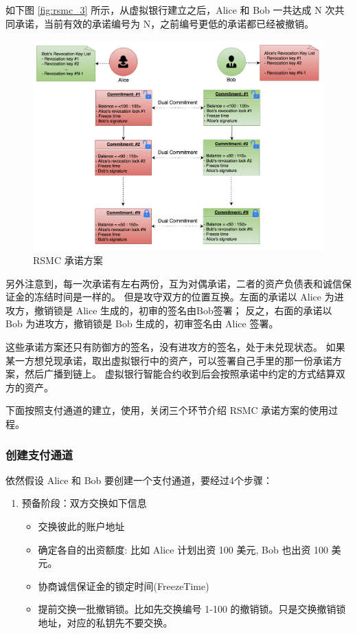 \begin{appendices}
如下图 \ref{fig:rsmc_3} 所示，从虚拟银行建立之后，Alice 和 Bob 一共达成 N 次共同承诺，当前有效的承诺编号为 N，之前编号更低的承诺都已经被撤销。

\begin{figure}[h!]
    \centering
    \includegraphics[width=12cm, keepaspectratio]{../images/dual_rsmc_3.png}
    \caption{RSMC 承诺方案}
    \label{fig:A_rsmc_3}
\end{figure}

另外注意到，每一次承诺有左右两份，互为对偶承诺，二者的资产负债表和诚信保证金的冻结时间是一样的。
但是攻守双方的位置互换。左面的承诺以 Alice 为进攻方，撤销锁是 Alice 生成的，初审的签名由Bob签署；
反之，右面的承诺以 Bob 为进攻方，撤销锁是 Bob 生成的，初审签名由 Alice 签署。

这些承诺方案还只有防御方的签名，没有进攻方的签名，处于未兑现状态。
如果某一方想兑现承诺，取出虚拟银行中的资产，可以签署自己手里的那一份承诺方案，然后广播到链上。
虚拟银行智能合约收到后会按照承诺中约定的方式结算双方的资产。

下面按照支付通道的建立，使用，关闭三个环节介绍 RSMC 承诺方案的使用过程。

\subsubsection{创建支付通道}
依然假设 Alice 和 Bob 要创建一个支付通道，要经过4个步骤：
\begin{enumerate}
    \item 预备阶段：双方交换如下信息
        \begin{itemize}
            \item 交换彼此的账户地址 
            \item 确定各自的出资额度: 比如 Alice 计划出资 100 美元, Bob 也出资 100 美元。
            \item 协商诚信保证金的锁定时间(FreezeTime)
            \item 提前交换一批撤销锁。比如先交换编号 1-100 的撤销锁。只是交换撤销锁地址，对应的私钥先不要交换。
        \end{itemize}
    

\end{enumerate}
\end{appendices}
